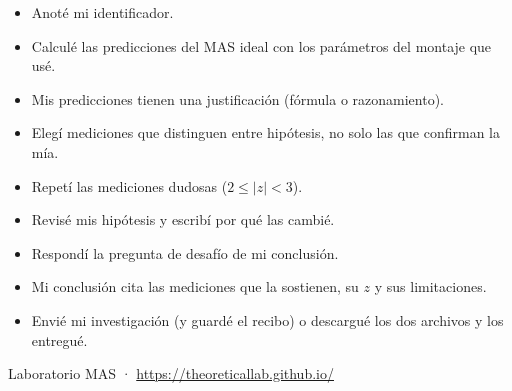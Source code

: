 \documentclass[11pt,a4paper]{article}
\begin{document}
\begin{itemize}[label=$\square$,itemsep=4pt]
\item Anoté mi identificador.
\item Calculé las predicciones del MAS ideal con los parámetros del montaje que usé.
\item Mis predicciones tienen una justificación (fórmula o razonamiento).
\item Elegí mediciones que distinguen entre hipótesis, no solo las que confirman la mía.
\item Repetí las mediciones dudosas ($2\le|z|<3$).
\item Revisé mis hipótesis y escribí por qué las cambié.
\item Respondí la pregunta de desafío de mi conclusión.
\item Mi conclusión cita las mediciones que la sostienen, su $z$ y sus limitaciones.
\item Envié mi investigación (y guardé el recibo) o descargué los dos archivos y los entregué.
\end{itemize}

\vfill
\begin{center}\small\textcolor{suave}{Laboratorio MAS · \url{https://theoreticallab.github.io/}}\end{center}
\end{document}
